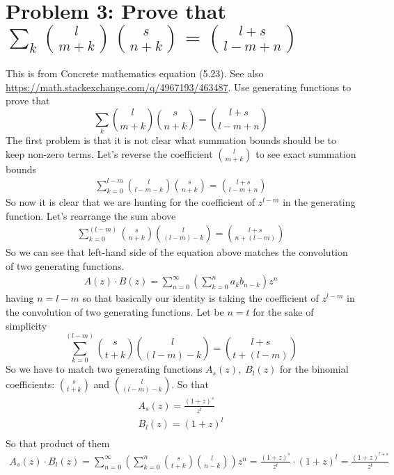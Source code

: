 ﻿\section{Problem 3: Prove that $\sum_{k} \binom{l}{m+k} \binom{s}{n+k} = \binom{l+s}{l-m+n}$}
\label{sec:problem-3:-concrete-mathematics-equation-(5.23)}
This is from Concrete mathematics equation (5.23).
See also \url{https://math.stackexchange.com/q/4967193/463487}.
Use generating functions to prove that
\begin{equation}
    \sum_{k} \binom{l}{m+k} \binom{s}{n+k} = \binom{l+s}{l-m+n}
    \label{eq:identity-to-prove-problem-3}
\end{equation}
The first problem is that it is not clear what summation bounds should be to keep non-zero terms.
Let's reverse the coefficient $\binom{l}{m+k}$ to see exact summation bounds
\begin{align*}
    \sum_{k=0}^{l-m} \binom{l}{l-m-k} \binom{s}{n+k} = \binom{l+s}{l-m+n}
\end{align*}
So now it is clear that we are hunting for the coefficient of $z^{l-m}$ in the generating function.
Let's rearrange the sum above
\begin{align*}
    \sum_{k=0}^{(l-m)} \binom{s}{n+k} \binom{l}{(l-m)-k} = \binom{l+s}{n+(l-m)}
\end{align*}
So we can see that left-hand side of the equation above matches the convolution of two generating functions.
\begin{align*}
    A(z) \cdot B(z) = \sum_{n=0}^{\infty} \left( \sum_{k=0}^{n} a_k b_{n-k} \right) z^n
\end{align*}
having $n=l-m$ so that basically our identity is taking the coefficient of $z^{l-m}$
in the convolution of two generating functions.
Let be $n=t$ for the sake of simplicity
\begin{equation}
    \sum_{k=0}^{(l-m)} \binom{s}{t+k} \binom{l}{(l-m)-k} = \binom{l+s}{t+(l-m)}
    \label{eq:identity-to-prove-problem-3-2}
\end{equation}
So we have to match two generating functions $A_s(z), \; B_l(z)$ for
the binomial coefficients: $\binom{s}{t+k}$ and $\binom{l}{(l-m)-k}$.
So that
\begin{align*}
    A_s(z) = \frac{(1+z)^s}{z^t} \\
    B_l(z) = (1+z)^l \\
\end{align*}
So that product of them
\begin{align*}
    A_s(z) \cdot B_l(z) = \sum_{n=0}^{\infty} \left( \sum_{k=0}^{n} \binom{s}{t+k} \binom{l}{n-k} \right) z^n
    = \frac{(1+z)^s}{z^t} \cdot (1+z)^l = \frac{(1+z)^{l+s}}{z^t}
\end{align*}
